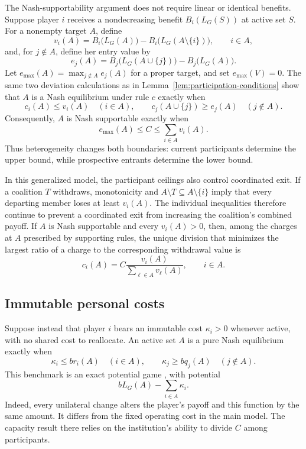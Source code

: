 \documentclass[preprint,12pt,authoryear]{elsarticle}
\newcommand{\LCC}{L}
\begin{document}
The Nash-supportability argument does not require linear or identical benefits.
Suppose player \(i\) receives a nondecreasing benefit
\(B_i(\LCC_G(S))\) at active set \(S\). For a nonempty target \(A\), define
\[
 v_i(A)=B_i\bigl(\LCC_G(A)\bigr)
 -B_i\bigl(\LCC_G(A\setminus\{i\})\bigr),
 \qquad i\in A,
\]
and, for \(j\notin A\), define her entry value by
\[
 e_j(A)=B_j\bigl(\LCC_G(A\cup\{j\})\bigr)
 -B_j\bigl(\LCC_G(A)\bigr).
\]
Let \(e_{\max}(A)=\max_{j\notin A}e_j(A)\) for a proper target, and set
\(e_{\max}(V)=0\). The same two deviation calculations as in
Lemma~\ref{lem:participation-conditions} show that \(A\) is a Nash equilibrium
under rule \(c\) exactly when
\[
 c_i(A)\leq v_i(A)\quad(i\in A),
 \qquad
 c_j(A\cup\{j\})\geq e_j(A)\quad(j\notin A).
\]
Consequently, \(A\) is Nash supportable exactly when
\[
 e_{\max}(A)\leq C\leq\sum_{i\in A}v_i(A).
\]
Thus heterogeneity changes both boundaries: current participants determine the
upper bound, while prospective entrants determine the lower bound.

In this generalized model, the participant ceilings also control coordinated
exit. If a coalition \(T\) withdraws, monotonicity and
\(A\setminus T\subseteq A\setminus\{i\}\) imply that every departing member
loses at least \(v_i(A)\). The individual inequalities therefore continue to
prevent a coordinated exit from increasing the coalition's combined payoff.
If \(A\) is Nash supportable and every \(v_i(A)>0\), then, among the charges
at \(A\) prescribed by supporting rules, the unique division that minimizes
the largest ratio of a charge to the corresponding withdrawal value is
\[
 c_i(A)=C\frac{v_i(A)}{\sum_{\ell\in A}v_\ell(A)},
 \qquad i\in A.
\]

\subsection{Immutable personal costs}

Suppose instead that player \(i\) bears an immutable cost \(\kappa_i>0\)
whenever active, with no shared cost to reallocate. An active set \(A\) is a
pure Nash equilibrium exactly when
\[
 \kappa_i\leq br_i(A)\quad(i\in A),
 \qquad
 \kappa_j\geq bq_j(A)\quad(j\notin A).
\]
This benchmark is an exact potential game \citep{MondererShapley1996}, with
potential
\[
 b\LCC_G(A)-\sum_{i\in A}\kappa_i.
\]
Indeed, every unilateral change alters the player's payoff and this function
by the same amount.
It differs from the fixed operating cost in the main model. The capacity result
there relies on the institution's ability to divide \(C\) among participants.
\end{document}
